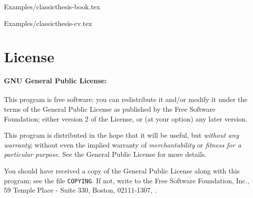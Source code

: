 %
    {Examples/classicthesis-book.tex}

%
    {Examples/classicthesis-cv.tex}


\section{License}
\paragraph{GNU General Public License:} This program is free software;
    you can redistribute it and/or modify
    it under the terms of the  General Public License as
    published by
    the Free Software Foundation; either version 2 of the License, or
    (at your option) any later version.

    This program is distributed in the hope that it will be useful,
    but \emph{without any warranty}; without even the implied warranty of
    \emph{merchantability} or \emph{fitness for a particular purpose}.
    See the
     General Public License for more details.

    You should have received a copy of the  General
    Public License
    along with this program; see the file \texttt{COPYING}. If not,
    write to
    the Free Software Foundation, Inc., 59 Temple Place - Suite 330,
    Boston,  02111-1307, .

